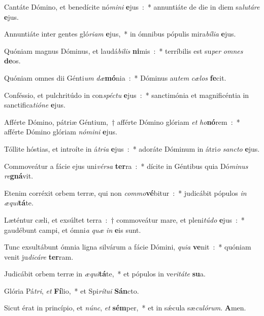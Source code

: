 \item Cantáte Dómino, et benedícite nó\emph{mi}\emph{ni} \textbf{e}jus~:~* annuntiáte de die in diem sa\emph{lu}\emph{tá}\emph{re} \textbf{e}jus.
\item Annuntiáte inter gentes gló\emph{ri}\emph{am} \textbf{e}jus,~* in ómnibus pópulis mira\emph{bí}\emph{li}\emph{a} \textbf{e}jus.
\item Quóniam magnus Dóminus, et laudá\emph{bi}\emph{lis} \textbf{ni}mis~:~* terríbilis est su\emph{per} \emph{om}\emph{nes} \textbf{de}os.
\item Quóniam omnes dii Génti\emph{um} \emph{dæ}\textbf{mó}nia~:~* Dóminus au\emph{tem} \emph{cæ}\emph{los} \textbf{fe}cit.
\item Conféssio, et pulchritúdo in con\emph{spé}\emph{ctu} \textbf{e}jus~:~* sanctimónia et magnificéntia in sanctifica\emph{ti}\emph{ó}\emph{ne} \textbf{e}jus.
\item Afférte Dómino, pátriæ Géntium,~† afférte Dómino glóriam \emph{et} \emph{ho}\textbf{nó}rem~:~* afférte Dómino glóriam \emph{nó}\emph{mi}\emph{ni} \textbf{e}jus.
\item Tóllite hóstias, et introíte in á\emph{tri}\emph{a} \textbf{e}jus~:~* adoráte Dóminum in átri\emph{o} \emph{san}\emph{cto} \textbf{e}jus.
\item Commoveátur a fácie ejus uni\emph{vér}\emph{sa} \textbf{ter}ra~:~* dícite in Géntibus quia Dó\emph{mi}\emph{nus} \emph{re}\textbf{gná}vit.
\item Etenim corréxit orbem terræ, qui non \emph{com}\emph{mo}\textbf{vé}bitur~:~* judicábit pópulos \emph{in} \emph{æ}\emph{qui}\textbf{tá}te.
\item Læténtur cæli, et exsúltet terra~:~† commoveátur mare, et pleni\emph{tú}\emph{do} \textbf{e}jus~:~* gaudébunt campi, et ómni\emph{a} \emph{quæ} \emph{in} \textbf{e}is sunt.
\item Tunc exsultábunt ómnia ligna silvárum a fácie Dómini, \emph{qui}\emph{a} \textbf{ve}nit~:~* quóniam venit ju\emph{di}\emph{cá}\emph{re} \textbf{ter}ram.
\item Judicábit orbem terræ in \emph{æ}\emph{qui}\textbf{tá}te,~* et pópulos in ve\emph{ri}\emph{tá}\emph{te} \textbf{su}a.
\item Glória Pá\emph{tri}, \emph{et} \textbf{Fí}lio,~* et Spi\emph{rí}\emph{tu}\emph{i} \textbf{Sán}cto.
\item Sicut érat in princípio, et \emph{núnc}, \emph{et} \textbf{sém}per,~* et in sǽcula sæ\emph{cu}\emph{ló}\emph{rum}. \textbf{A}men.